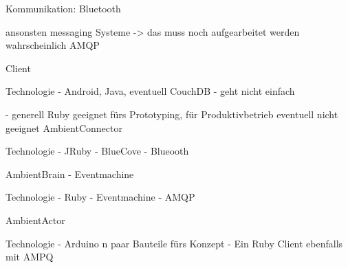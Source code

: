 Kommunikation:
Bluetooth

ansonsten messaging Systeme -> das muss noch aufgearbeitet werden wahrscheinlich AMQP

Client

Technologie
- Android, Java, eventuell CouchDB
- geht nicht einfach


- generell Ruby geeignet fürs Prototyping, für Produktivbetrieb eventuell nicht geeignet
AmbientConnector

Technologie
- JRuby 
- BlueCove 
- Blueooth 

AmbientBrain 
- Eventmachine

Technologie
- Ruby 
- Eventmachine
- AMQP

AmbientActor

Technologie
- Arduino n paar Bauteile fürs Konzept
- Ein Ruby Client ebenfalls mit AMPQ

